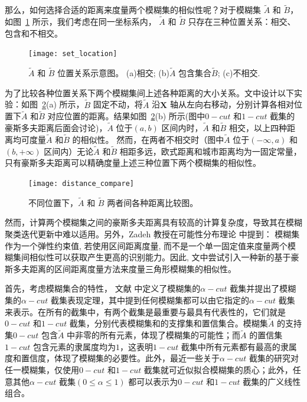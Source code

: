 那么，如何选择合适的距离来度量两个模糊集的相似性呢？对于模糊集 $\tilde{A}$ 和 $\tilde{B}$，如图~\ref{fig:set_location} 所示，我们考虑在同一坐标系内， $\tilde{A}$ 和 $\tilde{B}$ 只存在三种位置关系：相交、包含和不相交。

\begin{figure}[!htb]
    \centering
    \texttt{[image: set\_location]}
    \caption{$\tilde{A}$ 和 $\tilde{B}$ 位置关系示意图。 (a)相交; (b)$\tilde{A}$ 包含集合$\tilde{B}$;  (c)不相交.}
    \label{fig:set_location}
\end{figure}

为了比较各种位置关系下两个模糊集间上述各种距离的大小关系。文中设计以下实验：如图~\ref{fig:distance_compare}(a) 所示，$\tilde{B}$ 固定不动，将$\tilde{A}$ 沿$\textbf{X}$ 轴从左向右移动，分别计算各相对位置下$\tilde{A}$ 和$\tilde{B}$ 对应位置的距离。结果如图~\ref{fig:distance_compare}(b) 所示(图中$0-cut$ 和$1-cut$ 截集的豪斯多夫距离后面会讨论)，$\tilde{A}$ 位于$(a,b)$ 区间内时，$\tilde{A}$ 和$\tilde{B}$ 相交，以上四种距离均可度量$\tilde{A}$ 和$\tilde{B}$ 的相似性。 然而，在两者不相交时（图中$\tilde{A}$ 位于$(-\infty, a)$ 和$(b,+\infty)$ 区间内）无论$\tilde{A}$ 和$\tilde{B}$ 相距多远，欧式距离和城市距离均为一固定常量，只有豪斯多夫距离可以精确度量上述三种位置下两个模糊集的相似性。

\begin{figure}[!htb]
    \centering
    \texttt{[image: distance\_compare]}
    \caption{不同位置下，$\tilde{A}$ 和 $\tilde{B}$ 两者间各种距离比较图。}
    \label{fig:distance_compare}
\end{figure}

然而，计算两个模糊集之间的豪斯多夫距离具有较高的计算复杂度，导致其在模糊聚类迭代更新中难以适用。另外，Zadeh 教授在可能性分布理论\cite{zadeh1978fuzzy} 中提到： 模糊集作为一个弹性约束值, 若使用区间距离度量, 而不是一个单一固定值来度量两个模糊集间相似性可以获取产生更高的识别能力。因此, 文中尝试引入一种新的基于豪斯多夫距离的区间距离度量方法来度量三角形模糊集的相似性。

首先，考虑模糊集合的特性， 文献 \cite{zadeh1978fuzzy} 中定义了模糊集的$\alpha-cut$ 截集并提出了模糊集的$\alpha-cut$ 截集表现定理，其中提到任何模糊集都可以由它指定的$\alpha-cut$ 截集来表示。在所有的截集中，有两个截集是最重要与最具有代表性的，它们就是$0-cut$ 和$1-cut$ 截集，分别代表模糊集和的支撑集和置信集合。模糊集$\tilde{A}$ 的支持集$0-cut$ 包含$\tilde{A}$ 中非零的所有元素，体现了模糊集的可能性；而$\tilde{A}$ 的置信集$1-cut$ 包含元素的隶属度均为$1$，这表明$1-cut$ 截集中所有元素都有最高的隶属度和置信度，体现了模糊集的必要性。此外，最近一些关于$\alpha-cut$ 截集的研究对任一模糊集，仅使用$0-cut$ 和$1-cut$ 截集就可近似拟合模糊集的质心；此外，任意其他$\alpha -cut$ 截集$ (0 \leq \alpha \leq 1)$ 都可以表示为$0-cut$ 和$1-cut$ 截集的广义线性组合\cite{liu2008efficient}。

